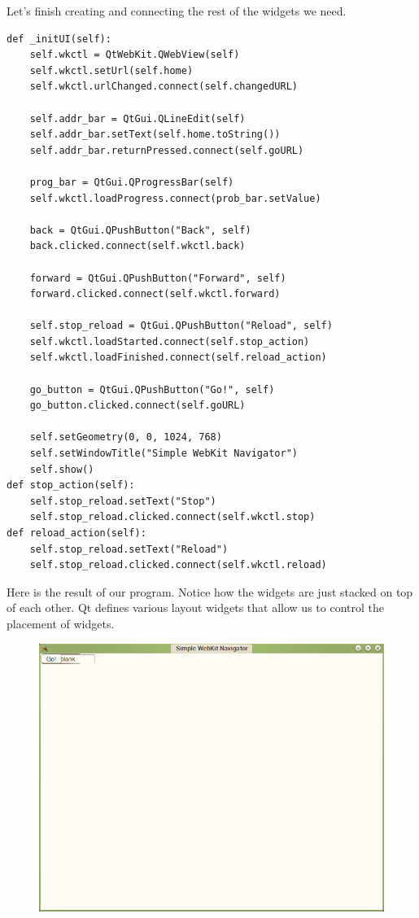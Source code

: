 Let's finish creating and connecting the rest of the widgets we need.
\begin{lstlisting}
def _initUI(self):
    self.wkctl = QtWebKit.QWebView(self)
    self.wkctl.setUrl(self.home)
    self.wkctl.urlChanged.connect(self.changedURL)
    
    self.addr_bar = QtGui.QLineEdit(self)
    self.addr_bar.setText(self.home.toString())
    self.addr_bar.returnPressed.connect(self.goURL)
    
    prog_bar = QtGui.QProgressBar(self)
    self.wkctl.loadProgress.connect(prob_bar.setValue)
    
    back = QtGui.QPushButton("Back", self)
    back.clicked.connect(self.wkctl.back)
    
    forward = QtGui.QPushButton("Forward", self)
    forward.clicked.connect(self.wkctl.forward)
    
    self.stop_reload = QtGui.QPushButton("Reload", self)
    self.wkctl.loadStarted.connect(self.stop_action)
    self.wkctl.loadFinished.connect(self.reload_action)
    
    go_button = QtGui.QPushButton("Go!", self)
    go_button.clicked.connect(self.goURL)
    
    self.setGeometry(0, 0, 1024, 768)
    self.setWindowTitle("Simple WebKit Navigator")
    self.show()
def stop_action(self):
    self.stop_reload.setText("Stop")
    self.stop_reload.clicked.connect(self.wkctl.stop)
def reload_action(self):
    self.stop_reload.setText("Reload")
    self.stop_reload.clicked.connect(self.wkctl.reload)
\end{lstlisting}

Here is the result of our program.  Notice how the widgets are just stacked on top of each other.  Qt defines various layout widgets that allow us to control the placement of widgets. 
\begin{figure}[H]
\centering
\includegraphics[scale=.5]{nolayout.png}
\end{figure}


